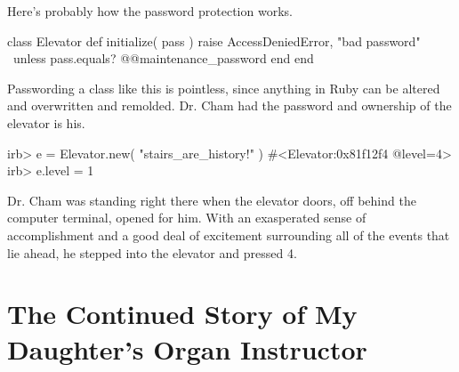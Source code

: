 \documentclass[12pt,twoside]{report}
\begin{document}
Here's probably how the password protection works.


\begin{rubycode}

 class Elevator
   def initialize( pass )
     raise AccessDeniedError, "bad password" \
       unless pass.equals? @@maintenance_password
   end
 end

\end{rubycode}


Passwording a class like this is pointless, since anything in Ruby can
be altered and overwritten and remolded.  Dr. Cham had the password
and ownership of the elevator is his.


\begin{consolecode}

 irb> e = Elevator.new( "stairs_are_history!" )
 #<Elevator:0x81f12f4 @level=4>
 irb> e.level = 1

\end{consolecode}


Dr. Cham was standing right there when the elevator doors, off behind
the computer terminal, opened for him.  With an exasperated sense of
accomplishment and a good deal of excitement surrounding all of the
events that lie ahead, he stepped into the elevator and pressed 4.

\newpage


\section{The Continued Story of My Daughter's Organ \mbox{Instructor}}
\end{document}
